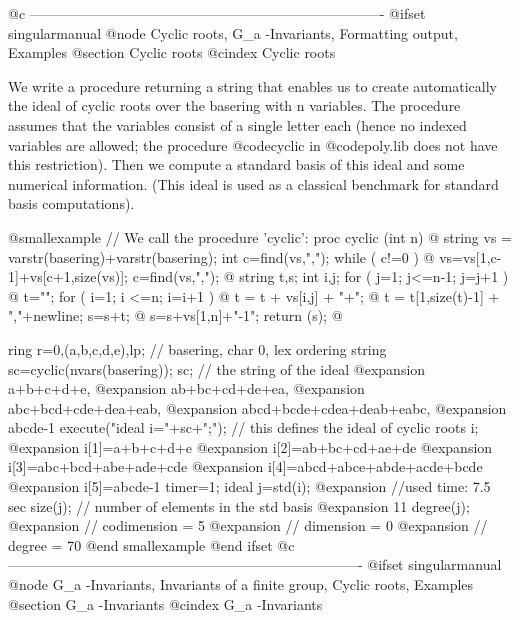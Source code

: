 @c ----------------------------------------------------------------------------
@ifset singularmanual
@node Cyclic roots, G_a -Invariants, Formatting output, Examples
@section Cyclic roots
@cindex Cyclic roots

We write a procedure returning a string that enables us to create
automatically the ideal of cyclic roots over the basering with n
variables. The procedure assumes that the variables consist of a single
letter each (hence no indexed variables are allowed; the procedure
@code{cyclic} in @code{poly.lib} does not have this restriction). Then
we compute a standard basis of this ideal and some numerical
information.  (This ideal is used as a classical benchmark for standard
basis computations).

@smallexample
// We call the procedure 'cyclic':
proc cyclic (int n)
@{
   string vs = varstr(basering)+varstr(basering);
   int c=find(vs,",");
   while ( c!=0 )
   @{
      vs=vs[1,c-1]+vs[c+1,size(vs)];
      c=find(vs,",");
   @}
   string t,s;
   int i,j;
   for ( j=1; j<=n-1; j=j+1 )
   @{
      t="";
      for ( i=1; i <=n; i=i+1 )
      @{
         t = t + vs[i,j] + "+";
      @}
      t = t[1,size(t)-1] + ","+newline;
      s=s+t;
   @}
   s=s+vs[1,n]+"-1";
   return (s);
@}

ring r=0,(a,b,c,d,e),lp;         // basering, char 0, lex ordering
string sc=cyclic(nvars(basering));
sc;                              // the string of the ideal
@expansion{} a+b+c+d+e,
@expansion{} ab+bc+cd+de+ea,
@expansion{} abc+bcd+cde+dea+eab,
@expansion{} abcd+bcde+cdea+deab+eabc,
@expansion{} abcde-1
execute("ideal i="+sc+";");      // this defines the ideal of cyclic roots
i;
@expansion{} i[1]=a+b+c+d+e
@expansion{} i[2]=ab+bc+cd+ae+de
@expansion{} i[3]=abc+bcd+abe+ade+cde
@expansion{} i[4]=abcd+abce+abde+acde+bcde
@expansion{} i[5]=abcde-1
timer=1;
ideal j=std(i);
@expansion{} //used time: 7.5 sec
size(j);                         // number of elements in the std basis
@expansion{} 11
degree(j);
@expansion{} // codimension = 5
@expansion{} // dimension   = 0
@expansion{} // degree      = 70
@end smallexample
@end ifset
@c ----------------------------------------------------------------------------
@ifset singularmanual
@node G_a -Invariants, Invariants of a finite group, Cyclic roots, Examples
@section G_a -Invariants
@cindex G_a -Invariants

